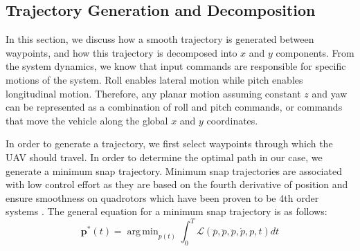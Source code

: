 \documentclass[letterpaper, 10 pt, conference]{ieeeconf}  %
\newcommand\NB[1]{$\spadesuit$\footnote{NB: #1}}
\DeclareMathOperator*{\argmin}{arg\,min}
\begin{document}
\subsection{Trajectory Generation and Decomposition} \label{sec:traj}

In this section, we discuss how a smooth trajectory is generated between waypoints, and how this trajectory is decomposed into $x$ and $y$ components. From the system dynamics, we know that input commands are responsible for specific motions of the system. Roll enables lateral motion while pitch enables longitudinal motion. Therefore, any planar motion assuming constant $z$ and yaw can be represented as a combination of roll and pitch commands, or commands that move the vehicle along the global $x$ and $y$ coordinates. 



In order to generate a trajectory, we first select waypoints through which the UAV should travel. In order to determine the optimal path in our case, we generate a minimum snap trajectory. Minimum snap trajectories are associated with low control effort as they are based on the fourth derivative of position and ensure smoothness on quadrotors which have been proven to be 4th order systems \cite{minsnap}. The general equation for a minimum snap trajectory is as follows:
\begin{equation} \label{eq:minjerkint}
    \bm{p}^*(t) = \argmin_{p(t)}\int_0^T\mathcal{L}(\ddddot{p},\dddot{p},\ddot{p},\dot{p},p,t)dt
\end{equation}
\end{document}
